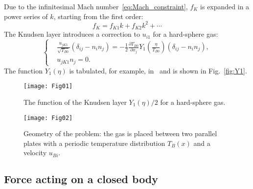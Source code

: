 \documentclass[smallextended]{svjour3} %
\newcommand{\pder}[2][]{\frac{\partial#1}{\partial#2}}
\begin{document}
Due to the infinitesimal Mach number~\eqref{eq:Mach_constraint}, \(f_K\) is expanded
in a power series of \(k\), starting from the first order:
\[ f_K = f_{K1} k + f_{K2} k ^ 2 + \cdots \]
The Knudsen layer introduces a correction to \(u_{i1}\) for a hard-sphere gas:
\begin{equation}
    \left\{
    \begin{aligned}
        & \frac{u_{jK1}}{\sqrt{T_{B0}}}(\delta_{ij}-n_in_j) =
            -\frac12\pder[T_{B0}]{x_j} Y_1\left(\frac\eta{T_{B0}}\right) (\delta_{ij}-n_in_j), \\
        & u_{jK1}n_j = 0.
    \end{aligned}
    \right. \label{eq:bound:v_K}
\end{equation}
The function \(Y_1(\eta)\) is tabulated, for example, in~\cite{Sone2002, Sone2007} and is shown in Fig.~\ref{fig:Y1}.

\begin{figure}[ht]
    \centering
    \begin{minipage}{.48\textwidth}
        \centering
        \texttt{[image: Fig01]}
        \caption{The function of the Knudsen layer \(Y_1(\eta)/2\) for a hard-sphere gas.}
        \label{fig:Y1}
    \end{minipage}
    \quad
    \begin{minipage}{.48\textwidth}
        \centering
        \texttt{[image: Fig02]}
        \vspace{13pt}
        \caption{Geometry of the problem: the gas is placed between two parallel plates
            with a periodic temperature distribution \(T_B(x)\) and a velocity \(u_{Bi}\).}
        \label{fig:geometry}
    \end{minipage}
\end{figure}

\subsection{Force acting on a closed body}
\end{document}
